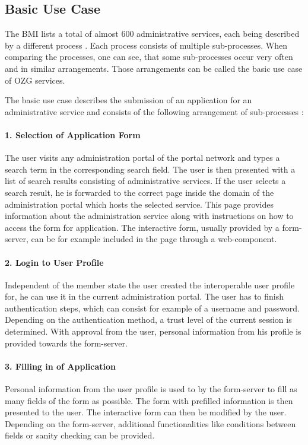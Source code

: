 \documentclass[
     12pt,         %
     a4paper,      %
     BCOR=10mm,version=first,     %
     DIV=14,version=first,        %
     ]{scrreprt}
\begin{document}
\subsection{Basic Use Case}
The BMI lists a total of almost 600 administrative services, each being described by a different process \cite{BMI:Informatiosplattform}. Each process consists of multiple sub-processes. When comparing the processes, one can see, that some sub-processes occur very often and in similar arrangements. Those arrangements can be called the basic use case of OZG services.

The basic use case describes the submission of an application for an administrative service and consists of the following arrangement of sub-processes \cite{NRW:Umsetzung}:

\paragraph{1. Selection of Application Form}
The user visits any administration portal of the portal network and types a search term in the corresponding search field. The user is then presented with a list of search results consisting of administrative services. If the user selects a search result, he is forwarded to the correct page inside the domain of the administration portal which hosts the selected service. This page provides information about the administration service along with instructions on how to access the form for application. The interactive form, usually provided by a form-server, can be for example included in the page through a web-component.

\paragraph{2. Login to User Profile}
Independent of the member state the user created the interoperable user profile for, he can use it in the current administration portal. The user has to finish authentication steps, which can consist for example of a username and password. Depending on the authentication method, a trust level of the current session is determined. With approval from the user, personal information from his profile is provided towards the form-server.

\paragraph{3. Filling in of Application}
Personal information from the user profile is used to by the form-server to fill as many fields of the form as possible. The form with prefilled information is then presented to the user. The interactive form can then be modified by the user. Depending on the form-server, additional functionalities like conditions between fields or sanity checking can be provided.
\end{document}
